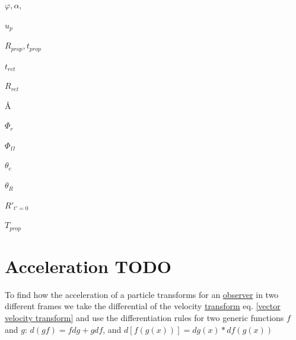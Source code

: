 $\varphi, \alpha,$  \newline

$u_p$ \newline

$R_{prop}, t_{prop}$ \newline

$t_{ret}$ \newline

$R_{ret}$ \newline

\AA  \newline

$\Phi_r$ \newline

$\Phi_{\Omega}$ \newline

$\theta_c$ \newline

$\theta_R$ \newline

$R'_{t'=0}$ \newline

$T_{prop}$ \newline

\chapter{Acceleration TODO}

To find how the acceleration of a particle transforms for an \hyperlink{def-observer}{observer} in two different frames we take the differential of the velocity \hyperlink{def-transform}{transform} eq. \eqref{vector velocity transform} and use the differentiation rules for two generic functions $f$ and $g$: $d(gf)=f dg+g df$, and $d[f(g(x))]= dg(x) * df(g(x))$

